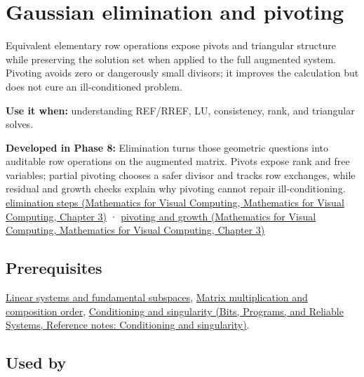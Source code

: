 \hypertarget{appendix-f6e77f4a200f}{}\label{referencestart:appendix-f6e77f4a200f}
\section{Gaussian elimination and pivoting}\label{appendix-f6e77f4a200f-gaussian-elimination-and-pivoting}

Equivalent elementary row operations expose pivots and triangular structure while preserving the solution set when applied to the full augmented system. Pivoting avoids zero or dangerously small divisors; it improves the calculation but does not cure an ill-conditioned problem.

\textbf{Use it when:} understanding REF/RREF, LU, consistency, rank, and triangular solves.

\textbf{Developed in Phase 8:} Elimination turns those geometric questions into auditable row operations on the augmented matrix. Pivots expose rank and free variables; partial pivoting chooses a safer divisor and tracks row exchanges, while residual and growth checks explain why pivoting cannot repair ill-conditioning. \href{../02-Mathematics-for-Visual-Computing/main.pdf\#nameddest=01-foundations-i-ch019-elimination-turns-the-geometry-into-an-auditable-calculation}{elimination steps (Mathematics for Visual Computing, Mathematics for Visual Computing, Chapter 3)} · \href{../02-Mathematics-for-Visual-Computing/main.pdf\#nameddest=01-foundations-i-ch019-pivoting-separates-algorithm-failure-from-matrix-failure}{pivoting and growth (Mathematics for Visual Computing, Mathematics for Visual Computing, Chapter 3)}

\subsection{Prerequisites}\label{appendix-f6e77f4a200f-prerequisites}

\hyperref[appendix-8572a4a060c1]{Linear systems and fundamental subspaces}, \hyperref[appendix-ab31ef447dbf]{Matrix multiplication and composition order}, \href{../01-Bits-Programs-and-Reliable-Systems/main.pdf\#nameddest=appendix-8f6a01f284a7}{Conditioning and singularity (Bits, Programs, and Reliable Systems, Reference notes: Conditioning and singularity)}.

\subsection{Used by}\label{appendix-f6e77f4a200f-used-by}

